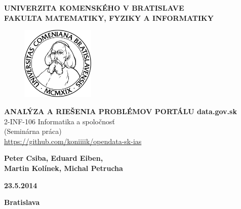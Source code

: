 \documentclass[12pt,a4paper]{article}
\begin{document}
\thispagestyle{empty}
\begin{center}
    \large{
        \textbf{
            UNIVERZITA KOMENSKÉHO V BRATISLAVE \\ 
            FAKULTA MATEMATIKY, FYZIKY A INFORMATIKY
        }
    }
\end{center}

\vspace{2cm}

\begin{figure}[!h]
    \centering
    \includegraphics[width=3.5cm]{komlogo-new.pdf}
\end{figure}

\vspace{1cm}

\begin{center}
    \large{
        \textbf{
            ANALÝZA A RIEŠENIA PROBLÉMOV PORTÁLU data.gov.sk
        }\\
        
        2-INF-106	Informatika a spoločnosť \\
        (Seminárna práca)\\ 
        \href{https://github.com/koniiiik/opendata-sk-ias}{https://github.com/koniiiik/opendata-sk-ias} 
            
        \vspace{1.5cm}
        
        \textbf{
            Peter Csiba, Eduard Eiben, \\  
            Martin Kolínek, Michal Petrucha
        } \\

    }
\end{center}

\vfill

\begin{multicols}{2}
    \begin{flushleft}
        \textbf{23.5.2014}
    \end{flushleft}
    \begin{flushright}
        \textbf{Bratislava}
    \end{flushright}
\end{multicols}
\end{document}
